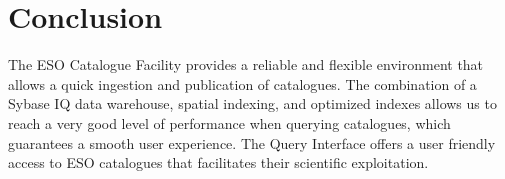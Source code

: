 \section{Conclusion}
The ESO Catalogue Facility provides a reliable and flexible environment that allows a quick ingestion and publication of catalogues. The combination of a Sybase IQ data warehouse, spatial indexing, and optimized indexes allows us to reach a very good level of performance when querying catalogues, which guarantees a smooth user experience. The Query Interface offers a user friendly access to ESO catalogues that facilitates their scientific exploitation.


